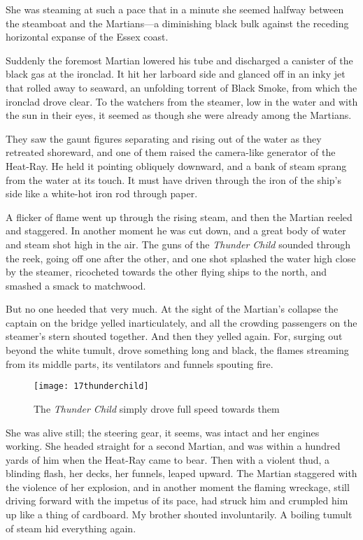 She was steaming at such a pace that in a minute she seemed halfway between the steamboat and the Martians—a diminishing black bulk against the receding horizontal expanse of the Essex coast.

Suddenly the foremost Martian lowered his tube and discharged a canister of the black gas at the ironclad. It hit her larboard side and glanced off in an inky jet that rolled away to seaward, an unfolding torrent of Black Smoke, from which the ironclad drove clear. To the watchers from the steamer, low in the water and with the sun in their eyes, it seemed as though she were already among the Martians.

They saw the gaunt figures separating and rising out of the water as they retreated shoreward, and one of them raised the camera-like generator of the Heat-Ray. He held it pointing obliquely downward, and a bank of steam sprang from the water at its touch. It must have driven through the iron of the ship's side like a white-hot iron rod through paper.

A flicker of flame went up through the rising steam, and then the Martian reeled and staggered. In another moment he was cut down, and a great body of water and steam shot high in the air. The guns of the \textit{Thunder Child} sounded through the reek, going off one after the other, and one shot splashed the water high close by the steamer, ricocheted towards the other flying ships to the north, and smashed a smack to matchwood.

But no one heeded that very much. At the sight of the Martian's collapse the captain on the bridge yelled inarticulately, and all the crowding passengers on the steamer's stern shouted together. And then they yelled again. For, surging out beyond the white tumult, drove something long and black, the flames streaming from its middle parts, its ventilators and funnels spouting fire.


\begin{sidewaysfigure}
	\centering
\texttt{[image: 17thunderchild]}
\caption{The \textit{Thunder Child} simply drove full speed towards them}
\end{sidewaysfigure}


She was alive still; the steering gear, it seems, was intact and her engines working. She headed straight for a second Martian, and was within a hundred yards of him when the Heat-Ray came to bear. Then with a violent thud, a blinding flash, her decks, her funnels, leaped upward. The Martian staggered with the violence of her explosion, and in another moment the flaming wreckage, still driving forward with the impetus of its pace, had struck him and crumpled him up like a thing of cardboard. My brother shouted involuntarily. A boiling tumult of steam hid everything again.

